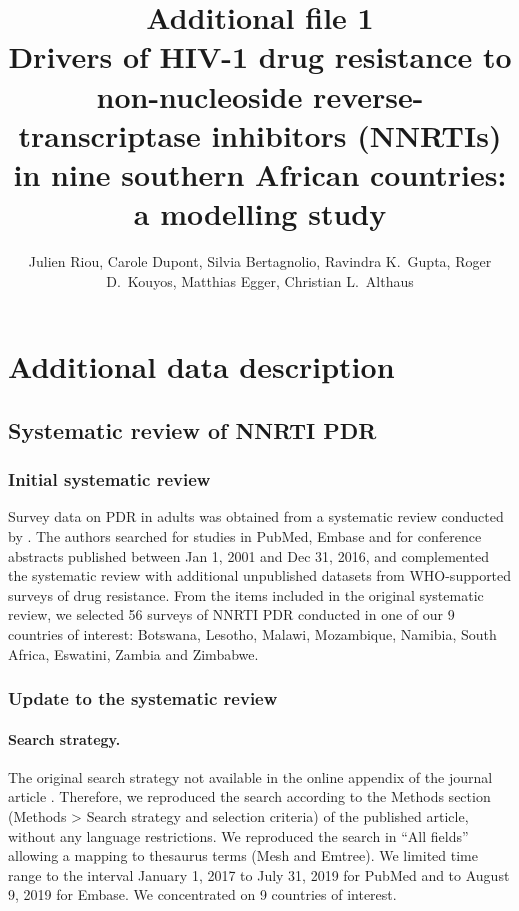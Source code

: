 \documentclass{article}
\title{{\sc Additional file 1} \\[.5em] Drivers of HIV-1 drug resistance to non-nucleoside reverse-transcriptase inhibitors (NNRTIs) in nine southern African countries: a modelling study }
\author{Julien Riou, Carole Dupont, Silvia Bertagnolio, Ravindra K.~Gupta, Roger D.~Kouyos, Matthias Egger, Christian L.~Althaus}
\date{}
\begin{document}
	\maketitle
	\tableofcontents
	\clearpage
	
	\section{Additional data description}
	\subsection{Systematic review of NNRTI PDR}
	
	
	
	
	\subsubsection{Initial systematic review}
	
	Survey data on PDR in adults was obtained from a systematic review conducted by \cite{gupta2018hiv}.
	The authors searched for studies in PubMed, Embase and for conference abstracts published between Jan 1, 2001 and Dec 31, 2016, and complemented the systematic review with additional unpublished datasets from WHO-supported surveys of drug resistance. From the items included in the original systematic review, we selected 56 surveys of NNRTI PDR conducted in one of our 9 countries of interest: Botswana, Lesotho, Malawi, Mozambique, Namibia, South Africa, Eswatini, Zambia and Zimbabwe. 
	
	
	\subsubsection{Update to the systematic review}
	
	\paragraph{Search strategy.}
	The original search strategy not available in the online appendix of the journal article \cite{gupta2018hiv}. Therefore, we reproduced the search according to the Methods section (Methods > Search strategy and selection criteria) of the published article, without any language restrictions. We reproduced the search in “All fields” allowing a mapping to thesaurus terms (Mesh and Emtree). We limited time range to the interval January 1, 2017 to July 31, 2019 for PubMed and to August 9, 2019 for Embase.
	We concentrated on 9 countries of interest.
	
\end{document}
